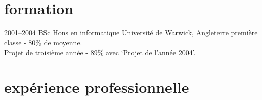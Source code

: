 \documentclass[]{friggeri-cv} %
\begin{document}
\section{formation}

\begin{entrylist}
\entry
{2001--2004}
{BSc Hons en informatique}
{\href{http://www.warwick.ac.uk}{Université de Warwick, Angleterre}}
{première classe - 80\% de moyenne.\\
Projet de troisième année - 89\% avec `Projet de l'année 2004'.}
\end{entrylist}


\section{expérience professionnelle}
\end{document}

